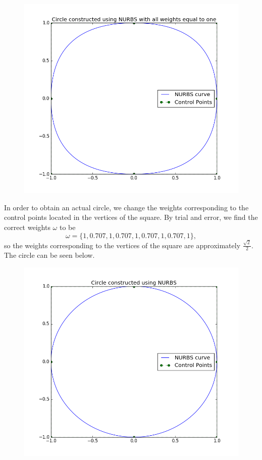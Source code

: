 \documentclass[]{article}
\begin{document}
\begin{figure}[h!]
	\includegraphics[scale=0.5]{splinecircle}
\end{figure}
In order to obtain an actual circle, we change the weights corresponding to the control points located in the vertices of the square. By trial and error, we find the correct weights $\omega$ to be \begin{equation*}
\omega= \{1, 0.707, 1, 0.707, 1, 0.707, 1, 0.707, 1\},
\end{equation*}
so the weights corresponding to the vertices of the square are approximately $\frac{\sqrt{2}}{2}$. The circle can be seen below.
\begin{figure}[h!]
	\includegraphics[scale=0.5]{nurbscircle}
\end{figure}
\end{document}
